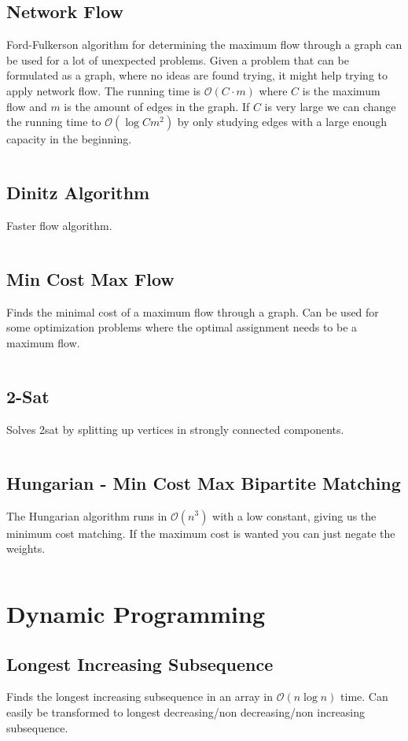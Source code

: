 \documentclass[8pt,a4paper,landscape,oneside]{amsart}
\newcommand{\codej}[1]{\inputminted[fontsize=\large,tabsize=2,baselinestretch=1]{java}{src/#1}}
\newcommand{\codec}[1]{\inputminted[fontsize=\large,tabsize=2,baselinestretch=1]{cpp}{src/#1}}
\newcommand{\codep}[1]{\inputminted[fontsize=\large,tabsize=2,baselinestretch=1]{py}{src/#1}}
\newcommand{\bigO}{\mathcal{O}}
\begin{document}
\begin{multicols*}{2}
\begin{large}
    \subsection{Network Flow}
        Ford-Fulkerson algorithm for determining the maximum flow through a graph can be used for a lot of unexpected problems. Given a problem that can be formulated as a graph, where no ideas are found trying, it might help trying to apply network flow. The running time is $\bigO (C \cdot m)$ where $C$ is the maximum flow and $m$ is the amount of edges in the graph.
        If $C$ is very large we can change the running time to $\bigO (\log{C}m^2)$ by only studying edges with a large enough capacity in the beginning.
        \codep{graphs/flow.py}
    \subsection{Dinitz Algorithm}
    Faster flow algorithm.
        \codep{graphs/dinitz.py}
    \subsection{Min Cost Max Flow}
        Finds the minimal cost of a maximum flow through a graph.
        Can be used for some optimization problems where the optimal assignment needs to be a maximum flow.
        \codej{graphs/MinCostMaxFlow.java}
    \subsection{2-Sat}
        Solves 2sat by splitting up vertices in strongly connected components.
        \codep{graphs/TwoSat.py}
    \subsection{Hungarian - Min Cost Max Bipartite Matching}
        The Hungarian algorithm runs in $\bigO(n^3)$ with a low constant, giving us the minimum cost matching. If the maximum cost is wanted you can just negate the weights.
        \codec{graphs/hungarian.py}

\section{Dynamic Programming}
    \subsection{Longest Increasing Subsequence}
        Finds the longest increasing subsequence in an array in $\bigO(n \log{n})$ time. Can easily be transformed to longest decreasing/non decreasing/non increasing subsequence.
        \codej{dynamicprogramming/lis.py}

\end{large}
\end{multicols*}
\end{document}
